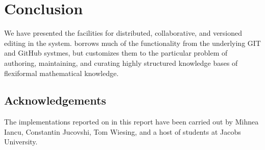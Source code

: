 \section{Conclusion}\label{sec:concl}

We have presented the facilities for distributed, collaborative, and versioned editing in
the \sys system. \sys borrows much of the functionality from the underlying GIT and GitHub
systmes, but customizes them to the particular problem of authoring, maintaining, and
curating highly structured knowledge bases of flexiformal mathematical knowledge. 

\subsection*{Acknowledgements}

The implementations reported on in this report have been carried out by Mihnea Iancu,
Constantin Jucovshi, Tom Wiesing, and a host of students at Jacobs University.


